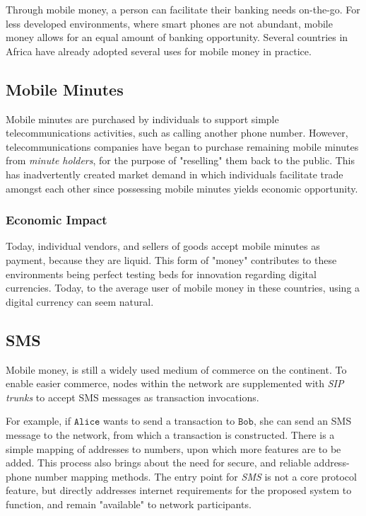 \documentclass[10pt, titlepage, twocolumn]{report}
\begin{document}
\hspace*{15pt}
Through mobile money, a person can facilitate their banking needs on-the-go. For less developed environments, where smart phones are not abundant, mobile money allows for an equal amount of banking opportunity. Several countries in Africa have already adopted several uses for mobile money in practice.

\subsection{Mobile Minutes}
\hspace*{15pt}
Mobile minutes are purchased by individuals to support simple telecommunications activities, such as calling another phone number. However, telecommunications companies have began to purchase remaining mobile minutes from \textit{minute holders}, for the purpose of "reselling" them back to the public. This has inadvertently created market demand in which individuals facilitate trade amongst each other since possessing mobile minutes yields economic opportunity.

\subsubsection{Economic Impact}
\hspace*{15pt}
Today, individual vendors, and sellers of goods accept mobile minutes as payment, because they are liquid. This form of "money" contributes to these environments being perfect testing beds for innovation regarding digital currencies. Today, to the average user of mobile money in these countries, using a digital currency can seem natural.

\subsection{SMS}
\hspace*{15pt}
Mobile money, is still a widely used medium of commerce on the continent. To enable easier commerce, nodes within the network are supplemented with \textit{SIP trunks} to accept SMS messages as transaction invocations. 

\hspace*{15pt}
For example, if \(\texttt{Alice}\) wants to send a transaction to \(\texttt{Bob}\), she can send an SMS message to the network, from which a transaction is constructed. There is a simple mapping of addresses to numbers, upon which more features are to be added. This process also brings about the need for secure, and reliable address-phone number mapping methods. The entry point for \textit{SMS} is not a core protocol feature, but directly addresses internet requirements for the proposed system to function, and remain "available" to network participants.
\end{document}
